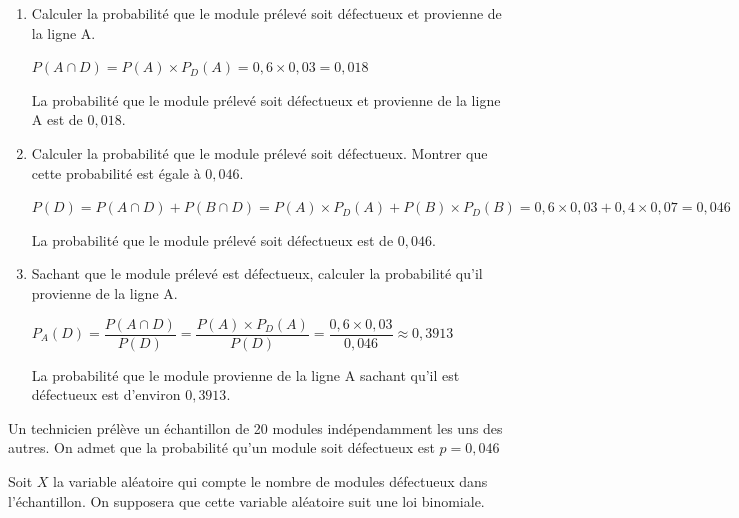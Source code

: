     
\begin{enumerate}[resume=monDS]
    \item Calculer la probabilité que le module prélevé soit défectueux et provienne de la ligne A.
     \begin{blocvisiblex}[height=2.5]
    {\quad}
    $P(A\cap D)=P(A) \times P_D(A)=0,6 \times 0,03=0,018$

    \smallskip
    La probabilité que le module prélevé soit défectueux et provienne de la ligne A est de $0,018$.
     \end{blocvisiblex}
     \medskip
    \item Calculer la probabilité que le module prélevé soit défectueux. Montrer que cette probabilité est égale à $0,046$.
    \begin{blocvisiblex}[height=2.5]
    {\quad}
    $P(D)=P(A\cap D)+P(B\cap D)=P(A) \times P_D(A)+P(B) \times P_D(B)=0,6 \times 0,03+0,4 \times 0,07=0,046$

        \smallskip
    La probabilité que le module prélevé soit défectueux est de $0,046$.
    \end{blocvisiblex}
    \medskip
    \item Sachant que le module prélevé est défectueux, calculer la probabilité qu'il provienne de la ligne A.
    \begin{blocvisiblex}[height=2.5]
    {\quad}
    $P_A(D)=\dfrac{P(A\cap D)}{P(D)}=\dfrac{P(A) \times P_D(A)}{P(D)}=\dfrac{0,6 \times 0,03}{0,046}\approx 0,3913$

        \smallskip
    La probabilité que le module provienne de la ligne A sachant qu'il est défectueux est d'environ $0,3913$.
     \end{blocvisiblex}
     \medskip
     
\end{enumerate}

Un technicien prélève un échantillon de 20 modules indépendamment les uns des autres. On admet que la probabilité qu'un module soit défectueux est $p=0,046$

Soit $X$ la variable aléatoire qui compte le nombre de modules défectueux dans l'échantillon. On supposera que cette variable aléatoire suit une loi binomiale.

